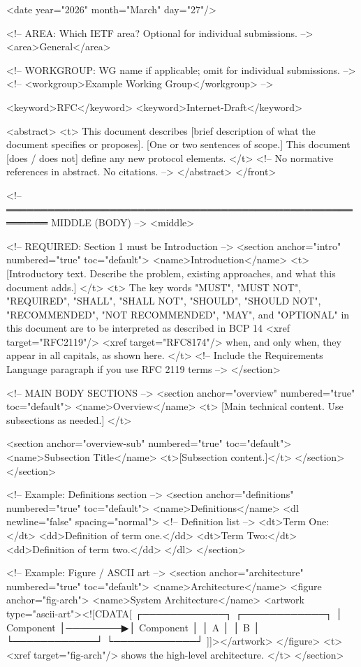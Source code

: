 \documentclass[11pt,letterpaper]{article}
\begin{document}
\begin{codebox}
  <date year="2026" month="March" day="27"/>

  <!-- AREA: Which IETF area? Optional for individual submissions. -->
  <area>General</area>

  <!-- WORKGROUP: WG name if applicable; omit for individual submissions. -->
  <!-- <workgroup>Example Working Group</workgroup> -->

  <keyword>RFC</keyword>
  <keyword>Internet-Draft</keyword>

  <abstract>
    <t>
      This document describes [brief description of what the document
      specifies or proposes]. [One or two sentences of scope.] This
      document [does / does not] define any new protocol elements.
    </t>
    <!-- No normative references in abstract. No citations. -->
  </abstract>
</front>

<!-- ════════════════════════════════════════════════════════ MIDDLE (BODY) -->
<middle>

  <!-- REQUIRED: Section 1 must be Introduction -->
  <section anchor="intro" numbered="true" toc="default">
    <name>Introduction</name>
    <t>
      [Introductory text. Describe the problem, existing approaches,
      and what this document adds.]
    </t>
    <t>
      The key words "MUST", "MUST NOT", "REQUIRED", "SHALL", "SHALL NOT",
      "SHOULD", "SHOULD NOT", "RECOMMENDED", "NOT RECOMMENDED", "MAY",
      and "OPTIONAL" in this document are to be interpreted as described
      in BCP 14 <xref target="RFC2119"/> <xref target="RFC8174"/> when,
      and only when, they appear in all capitals, as shown here.
    </t>
    <!-- Include the Requirements Language paragraph if you use RFC 2119 terms -->
  </section>

  <!-- MAIN BODY SECTIONS -->
  <section anchor="overview" numbered="true" toc="default">
    <name>Overview</name>
    <t>
      [Main technical content. Use subsections as needed.]
    </t>

    <section anchor="overview-sub" numbered="true" toc="default">
      <name>Subsection Title</name>
      <t>[Subsection content.]</t>
    </section>
  </section>

  <!-- Example: Definitions section -->
  <section anchor="definitions" numbered="true" toc="default">
    <name>Definitions</name>
    <dl newline="false" spacing="normal">
      <!-- Definition list -->
      <dt>Term One:</dt>
      <dd>Definition of term one.</dd>
      <dt>Term Two:</dt>
      <dd>Definition of term two.</dd>
    </dl>
  </section>

  <!-- Example: Figure / ASCII art -->
  <section anchor="architecture" numbered="true" toc="default">
    <name>Architecture</name>
    <figure anchor="fig-arch">
      <name>System Architecture</name>
      <artwork type="ascii-art"><![CDATA[
  ┌────────────┐         ┌────────────┐
  │  Component │────────▶│  Component │
  │     A      │         │     B      │
  └────────────┘         └────────────┘
      ]]></artwork>
    </figure>
    <t>
      <xref target="fig-arch"/> shows the high-level architecture.
    </t>
  </section>


\end{codebox}
\end{document}
